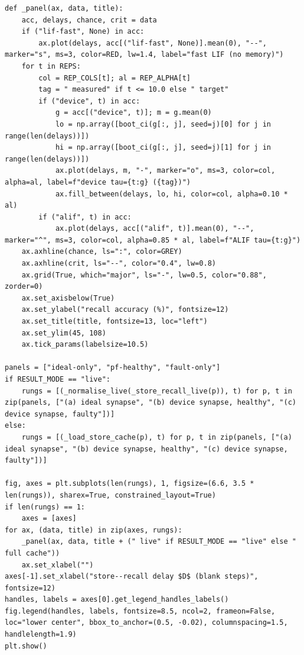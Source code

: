 \begin{lstlisting}[caption={experiments/temporal\_storerecall.ipynb},label={lst:mnn-nb-temporal-storerecall}]
def _panel(ax, data, title):
    acc, delays, chance, crit = data
    if ("lif-fast", None) in acc:
        ax.plot(delays, acc[("lif-fast", None)].mean(0), "--", marker="s", ms=3, color=RED, lw=1.4, label="fast LIF (no memory)")
    for t in REPS:
        col = REP_COLS[t]; al = REP_ALPHA[t]
        tag = " measured" if t <= 10.0 else " target"
        if ("device", t) in acc:
            g = acc[("device", t)]; m = g.mean(0)
            lo = np.array([boot_ci(g[:, j], seed=j)[0] for j in range(len(delays))])
            hi = np.array([boot_ci(g[:, j], seed=j)[1] for j in range(len(delays))])
            ax.plot(delays, m, "-", marker="o", ms=3, color=col, alpha=al, label=f"device tau={t:g} ({tag})")
            ax.fill_between(delays, lo, hi, color=col, alpha=0.10 * al)
        if ("alif", t) in acc:
            ax.plot(delays, acc[("alif", t)].mean(0), "--", marker="^", ms=3, color=col, alpha=0.85 * al, label=f"ALIF tau={t:g}")
    ax.axhline(chance, ls=":", color=GREY)
    ax.axhline(crit, ls="--", color="0.4", lw=0.8)
    ax.grid(True, which="major", ls="-", lw=0.5, color="0.88", zorder=0)
    ax.set_axisbelow(True)
    ax.set_ylabel("recall accuracy (%)", fontsize=12)
    ax.set_title(title, fontsize=13, loc="left")
    ax.set_ylim(45, 108)
    ax.tick_params(labelsize=10.5)

panels = ["ideal-only", "pf-healthy", "fault-only"]
if RESULT_MODE == "live":
    rungs = [(_normalise_live(_store_recall_live(p)), t) for p, t in zip(panels, ["(a) ideal synapse", "(b) device synapse, healthy", "(c) device synapse, faulty"])]
else:
    rungs = [(_load_store_cache(p), t) for p, t in zip(panels, ["(a) ideal synapse", "(b) device synapse, healthy", "(c) device synapse, faulty"])]

fig, axes = plt.subplots(len(rungs), 1, figsize=(6.6, 3.5 * len(rungs)), sharex=True, constrained_layout=True)
if len(rungs) == 1:
    axes = [axes]
for ax, (data, title) in zip(axes, rungs):
    _panel(ax, data, title + (" live" if RESULT_MODE == "live" else " full cache"))
    ax.set_xlabel("")
axes[-1].set_xlabel("store--recall delay $D$ (blank steps)", fontsize=12)
handles, labels = axes[0].get_legend_handles_labels()
fig.legend(handles, labels, fontsize=8.5, ncol=2, frameon=False, loc="lower center", bbox_to_anchor=(0.5, -0.02), columnspacing=1.5, handlelength=1.9)
plt.show()


\end{lstlisting}
